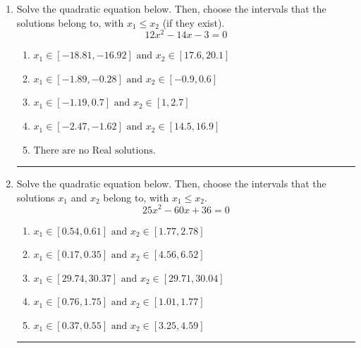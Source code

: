 \documentclass[14pt]{extbook}
\newcommand{\litem}[1]{\item#1\hspace*{-1cm}\rule{\textwidth}{0.4pt}}
\begin{document}
\begin{enumerate}
{\begin{enumerate}[label=\Alph*.]
\end{enumerate} }
\litem{
Solve the quadratic equation below. Then, choose the intervals that the solutions belong to, with $x_1 \leq x_2$ (if they exist).\[ 12x^{2} -14 x -3 = 0 \]\begin{enumerate}[label=\Alph*.]
\item \( x_1 \in [-18.81, -16.92] \text{ and } x_2 \in [17.6, 20.1] \)
\item \( x_1 \in [-1.89, -0.28] \text{ and } x_2 \in [-0.9, 0.6] \)
\item \( x_1 \in [-1.19, 0.7] \text{ and } x_2 \in [1, 2.7] \)
\item \( x_1 \in [-2.47, -1.62] \text{ and } x_2 \in [14.5, 16.9] \)
\item \( \text{There are no Real solutions.} \)

\end{enumerate} }
\litem{
Solve the quadratic equation below. Then, choose the intervals that the solutions $x_1$ and $x_2$ belong to, with $x_1 \leq x_2$.\[ 25x^{2} -60 x + 36 = 0 \]\begin{enumerate}[label=\Alph*.]
\item \( x_1 \in [0.54, 0.61] \text{ and } x_2 \in [1.77, 2.78] \)
\item \( x_1 \in [0.17, 0.35] \text{ and } x_2 \in [4.56, 6.52] \)
\item \( x_1 \in [29.74, 30.37] \text{ and } x_2 \in [29.71, 30.04] \)
\item \( x_1 \in [0.76, 1.75] \text{ and } x_2 \in [1.01, 1.77] \)
\item \( x_1 \in [0.37, 0.55] \text{ and } x_2 \in [3.25, 4.59] \)


\end{enumerate}}
\end{enumerate}
\end{document}
